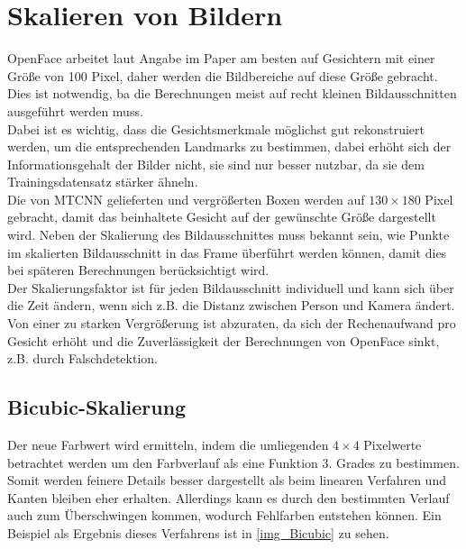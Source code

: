 \section{Skalieren von Bildern}
\label{scale_Algos}
OpenFace arbeitet laut Angabe im Paper \cite{OpenFace} am besten auf Gesichtern mit einer Größe von 100 Pixel, daher werden die Bildbereiche auf diese Größe gebracht. Dies ist notwendig, ba die Berechnungen meist auf recht kleinen Bildausschnitten ausgeführt werden muss.\\
Dabei ist es wichtig, dass die Gesichtsmerkmale möglichst gut rekonstruiert werden, um die entsprechenden Landmarks zu bestimmen, dabei erhöht sich der Informationsgehalt der Bilder nicht, sie sind nur besser nutzbar, da sie dem Trainingsdatensatz stärker ähneln.\\
Die von MTCNN gelieferten und vergrößerten Boxen werden auf $130 \times 180$ Pixel gebracht, damit das beinhaltete Gesicht auf der gewünschte Größe dargestellt wird. Neben der Skalierung des Bildausschnittes muss bekannt sein, wie Punkte im skalierten Bildausschnitt in das Frame überführt werden können, damit dies bei späteren Berechnungen berücksichtigt wird.\\
Der Skalierungsfaktor ist für jeden Bildausschnitt individuell und kann sich über die Zeit ändern, wenn sich z.B. die Distanz zwischen Person und Kamera ändert. Von einer zu starken Vergrößerung ist abzuraten, da sich der Rechenaufwand pro Gesicht erhöht und die Zuverlässigkeit der Berechnungen von OpenFace sinkt, z.B. durch Falschdetektion.
\subsection{Bicubic-Skalierung}
Der neue Farbwert wird ermitteln, indem die umliegenden $4\times 4$ Pixelwerte betrachtet werden um den Farbverlauf als eine Funktion 3. Grades zu bestimmen. Somit werden feinere Details besser dargestellt als beim linearen Verfahren und Kanten bleiben eher erhalten. Allerdings kann es durch den bestimmten Verlauf auch zum Überschwingen kommen, wodurch Fehlfarben entstehen können. Ein Beispiel als Ergebnis dieses Verfahrens ist in \autoref{img_Bicubic} zu sehen.\\
\cite{wiki_Bicubic}
